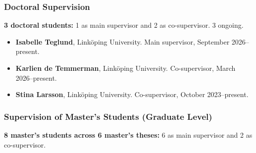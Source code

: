 \documentclass[]{article}
\begin{document}
\subsubsection{Doctoral Supervision}\label{doctoral-supervision}

\textbf{3 doctoral students:} 1 as main supervisor and 2 as
co-supervisor. 3 ongoing.

\begin{itemize}
\item
  \textbf{Isabelle Teglund}, Linköping University. Main supervisor,
  September 2026--present.
\item
  \textbf{Karlien de Temmerman}, Linköping University. Co-supervisor,
  March 2026--present.
\item
  \textbf{Stina Larsson}, Linköping University. Co-supervisor, October
  2023--present.
\end{itemize}

\subsubsection{Supervision of Master's Students (Graduate
Level)}\label{supervision-of-masters-students-graduate-level}

\textbf{8 master's students across 6 master's theses:} 6 as main
supervisor and 2 as co-supervisor.
\end{document}
